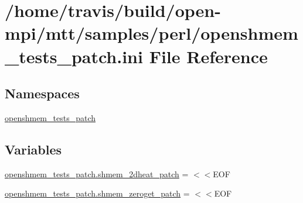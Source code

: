 \hypertarget{openshmem__tests__patch_8ini}{\section{/home/travis/build/open-\/mpi/mtt/samples/perl/openshmem\-\_\-tests\-\_\-patch.ini File Reference}
\label{openshmem__tests__patch_8ini}
}
\subsection*{Namespaces}
\begin{DoxyCompactItemize}
\item 
\hyperlink{namespaceopenshmem__tests__patch}{openshmem\-\_\-tests\-\_\-patch}
\end{DoxyCompactItemize}
\subsection*{Variables}
\begin{DoxyCompactItemize}
\item 
\hyperlink{namespaceopenshmem__tests__patch_a391991e1010e023b4787fba54765e3b1}{openshmem\-\_\-tests\-\_\-patch.\-shmem\-\_\-2dheat\-\_\-patch} = $<$$<$E\-O\-F
\item 
\hyperlink{namespaceopenshmem__tests__patch_a3aaaf9e5a26acd1ddc1ed38bee8c1366}{openshmem\-\_\-tests\-\_\-patch.\-shmem\-\_\-zeroget\-\_\-patch} = $<$$<$E\-O\-F
\end{DoxyCompactItemize}
